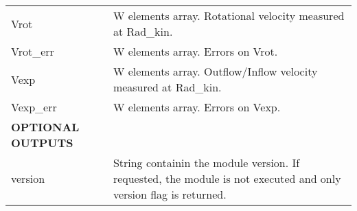\begin{center}
\begin{longtable}{p{2.7cm}| p{11.1cm}}
%
Vrot & W elements array. Rotational velocity measured at Rad\_kin. \\ 
%
Vrot\_err & W elements array. Errors on Vrot. \\ 
%
Vexp & W elements array. Outflow/Inflow velocity measured at Rad\_kin. \\ 
%
Vexp\_err & W elements array. Errors on Vexp. \\ 
%
%
\hline
{\bf OPTIONAL OUTPUTS}  & \\
\hline
 version  & String containin the module version. If requested, the module is not executed 
           and only version flag is returned.\\
\hline
\hline
\end{longtable}
\end{center}
